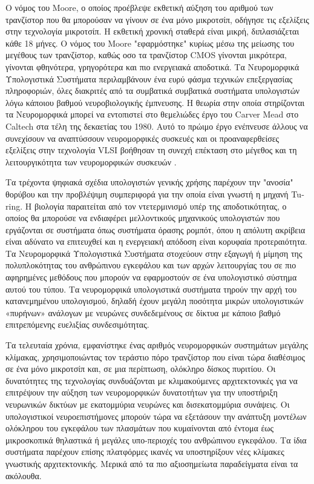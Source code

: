 \documentclass[12pt]{report}
\begin{document}
Ο νόμος του \textlatin{Moore}, ο οποίος προέβλεψε εκθετική αύξηση του αριθμού των τρανζίστορ που θα μπορούσαν να γίνουν σε ένα μόνο μικροτσίπ, οδήγησε τις εξελίξεις στην τεχνολογία μικροτσίπ. Η εκθετική χρονική σταθερά είναι μικρή, διπλασιάζεται κάθε 18 μήνες. Ο νόμος του \textlatin{Moore} "εφαρμόστηκε" κυρίως μέσω της μείωσης του μεγέθους των τρανζίστορ, καθώς οσο τα τρανζίστορ CMOS γίνονται μικρότερα, γίνονται φθηνότερα, γρηγορότερα και πιο ενεργειακά αποδοτικά.
Τα Νευρομορφικά Υπολογιστικά Συστήματα περιλαμβάνουν ένα ευρύ φάσμα τεχνικών επεξεργασίας πληροφοριών, όλες διακριτές από τα συμβατικά συμβατικά συστήματα υπολογιστών λόγω κάποιου βαθμού νευροβιολογικής έμπνευσης. Η θεωρία στην οποία στηρίζονται τα Νευρομορφικά μπορεί να εντοπιστεί στο θεμελιώδες έργο του \textlatin{Carver Mead} στο \textlatin{Caltech} στα τέλη της δεκαετίας του 1980. Αυτό το πρώιμο έργο ενέπνευσε άλλους να συνεχίσουν να αναπτύσσουν νευρομορφικές συσκευές και οι προαναφερθείσες εξελίξεις στην τεχνολογία \textlatin{VLSI} βοήθησαν τη συνεχή επέκταση στο μέγεθος και τη λειτουργικότητα των νευρομορφικών συσκευών \cite{furber2016}.

Τα τρέχοντα ψηφιακά σχέδια υπολογιστών γενικής χρήσης παρέχουν την "ανοσία" θορύβου και την προβλέψιμη συμπεριφορά για την οποία είναι γνωστή η μηχανή \textlatin{Turing}. Η βιολογία παραιτείται από τον ντετερμινισμό υπέρ της αποδοτικότητας, ο οποίος θα μπορούσε να ενδιαφέρει μελλοντικούς μηχανικούς υπολογιστών που εργάζονται σε συστήματα όπως συστήματα όρασης ρομπότ, όπου η απόλυτη ακρίβεια είναι αδύνατο να επιτευχθεί και η ενεργειακή απόδοση είναι κορυφαία προτεραιότητα. Τα Νευρομορφικά Υπολογιστικά Συστήματα στοχεύουν στην εξαγωγή ή μίμηση της πολυπλοκότητας του ανθρώπινου εγκεφάλου και των αρχών λειτουργίας του σε πιο αφηρημένες μεθόδους που μπορούν να εφαρμοστούν σε ένα υπολογιστικό σύστημα αυτού του τύπου. Τα νευρομορφικά υπολογιστικά συστήματα τηρούν την αρχή του κατανεμημένου υπολογισμού, δηλαδή έχουν μεγάλη ποσότητα μικρών υπολογιστικών «πυρήνων» ανάλογων με νευρώνες συνδεδεμένους σε δίκτυα με κάποιο βαθμό επιτρεπόμενης ευελιξίας συνδεσιμότητας. 

Τα τελευταία χρόνια, εμφανίστηκε ένας αριθμός νευρομορφικών συστημάτων μεγάλης κλίμακας, χρησιμοποιώντας τον τεράστιο πόρο τρανζίστορ που είναι τώρα διαθέσιμος σε ένα μόνο μικροτσίπ και, σε μια περίπτωση, ολόκληρο δίσκος πυριτίου. Οι δυνατότητες της τεχνολογίας συνδυάζονται με κλιμακούμενες αρχιτεκτονικές για να επιτρέψουν την αύξηση των νευρομορφικών δυνατοτήτων για την υποστήριξη νευρωνικών δικτύων με εκατομμύρια νευρώνες και δισεκατομμύρια συνάψεις. Οι υπολογιστικοί νευροεπιστήμονες μπορούν τώρα να εξετάσουν την ανάπτυξη μοντέλων ολόκληρου του εγκεφάλου των πλασμάτων που κυμαίνονται από έντομα έως μικροσκοπικά θηλαστικά ή μεγάλες υπο-περιοχές του ανθρώπινου εγκεφάλου. Τα ίδια συστήματα παρέχουν επίσης πλατφόρμες ικανές να υποστηρίξουν νέες κλίμακες γνωστικής αρχιτεκτονικής. Μερικά από τα πιο αξιοσημείωτα παραδείγματα είναι τα ακόλουθα.
\end{document}
